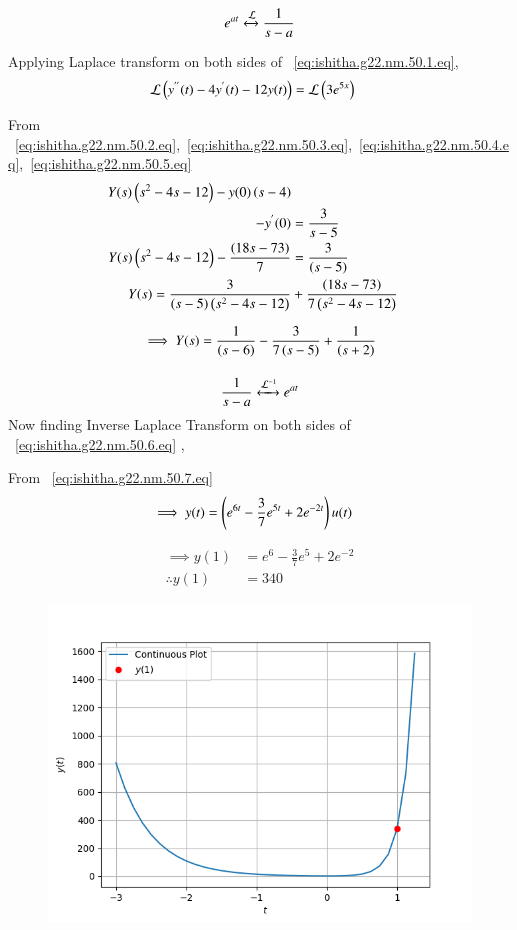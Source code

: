 \documentclass[journal,12pt,twocolumn]{IEEEtran}
\theoremstyle{remark}
\begin{document}
\begin{equation}
e^{at}   \stackrel{}{\xleftrightarrow{\mathcal{L}}}  \frac{1}{s-a} \\ \label{eq:ishitha.g22.nm.50.5.eq}
\end{equation}

Applying Laplace transform on both sides of  ~\eqref{eq:ishitha.g22.nm.50.1.eq},
\begin{align}
\mathcal{L}\left(y^{''}(t) - 4y^{'}(t) -12y(t)\right)&=\mathcal{L}\left(3e^{5x}\right)
\end{align}

From ~\eqref{eq:ishitha.g22.nm.50.2.eq},~\eqref{eq:ishitha.g22.nm.50.3.eq},~\eqref{eq:ishitha.g22.nm.50.4.eq},~\eqref{eq:ishitha.g22.nm.50.5.eq}
\begin{align}
Y(s)\left(s^{2}-4s-12\right) -y(0)\left(s-4\right) \nonumber \\-y^{'}(0) &= \frac{3}{s-5} \\
Y(s)\left(s^{2}-4s-12\right) - \frac{\left(18s -73 \right)}{7}  &=\frac{3}{(s-5)} \\
Y(s) = \frac{3}{(s-5)\left(s^{2}-4s-12\right)} &+ \frac{\left(18s -73 \right)}{7\left(s^{2}-4s-12\right) } 
\end{align}

\begin{equation}
\implies Y(s) = \frac{1}{\left(s-6\right)} -\frac{3}{7\left(s-5\right)} + \frac{1}{\left(s+2\right)} \\ \label{eq:ishitha.g22.nm.50.6.eq}
\end{equation}


\begin{equation}
\frac{1}{s-a}   \stackrel{}{\xleftrightarrow{\mathcal{L}^{-1}}}  e^{at}  \\ \label{eq:ishitha.g22.nm.50.7.eq}
\end{equation}
Now finding Inverse Laplace Transform on both sides of ~\eqref{eq:ishitha.g22.nm.50.6.eq} ,

From ~\eqref{eq:ishitha.g22.nm.50.7.eq}
\begin{align}
\implies y(t) &= \left(e^{6t} -\frac{3}{7}e^{5t} + 2e^{-2t}\right)u(t)
\end{align}

\begin{align}
\implies y(1) &= e^{6} -\frac{3}{7}e^{5} + 2e^{-2} \\
\therefore y(1) &= 340
\end{align}

\begin{figure}[!ht]
    \centering
     \includegraphics[width=\columnwidth]{2022/NM/50/figs/g50fig1.png}
    \caption{}    
    \label{fig:ishitha.g22.nm.50.f2}
\end{figure}
\end{document}
